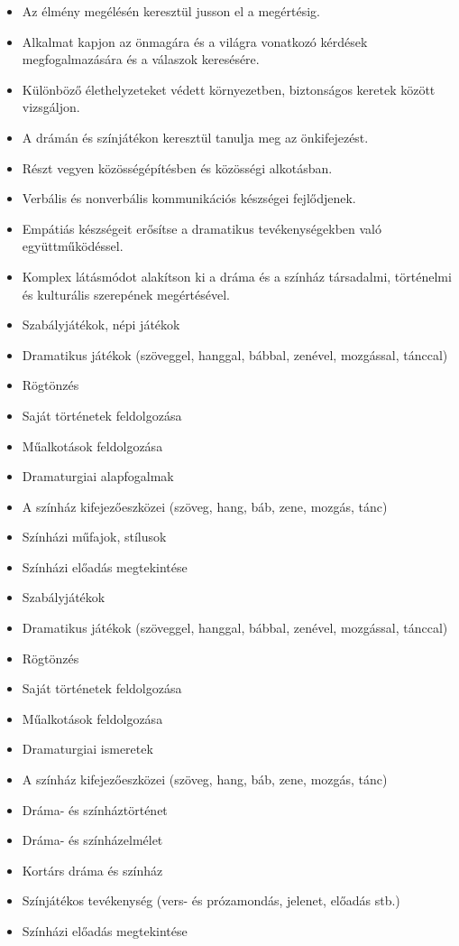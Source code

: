 \begin{itemize}
\item
  Az élmény megélésén keresztül jusson el a megértésig.
\item
  Alkalmat kapjon az önmagára és a világra vonatkozó kérdések
  megfogalmazására és a válaszok keresésére.
\item
  Különböző élethelyzeteket védett környezetben, biztonságos keretek
  között vizsgáljon.
\item
  A drámán és színjátékon keresztül tanulja meg az önkifejezést.
\item
  Részt vegyen közösségépítésben és közösségi alkotásban.
\item
  Verbális és nonverbális kommunikációs készségei fejlődjenek.
\item
  Empátiás készségeit erősítse a dramatikus tevékenységekben való
  együttműködéssel.
\item
  Komplex látásmódot alakítson ki a dráma és a színház társadalmi,
  történelmi és kulturális szerepének megértésével.
\item
  Szabályjátékok, népi játékok
\item
  Dramatikus játékok (szöveggel, hanggal, bábbal, zenével, mozgással,
  tánccal)
\item
  Rögtönzés
\item
  Saját történetek feldolgozása
\item
  Műalkotások feldolgozása
\item
  Dramaturgiai alapfogalmak
\item
  A színház kifejezőeszközei (szöveg, hang, báb, zene, mozgás, tánc)
\item
  Színházi műfajok, stílusok
\item
  Színházi előadás megtekintése
\item
  Szabályjátékok
\item
  Dramatikus játékok (szöveggel, hanggal, bábbal, zenével, mozgással,
  tánccal)
\item
  Rögtönzés
\item
  Saját történetek feldolgozása
\item
  Műalkotások feldolgozása
\item
  Dramaturgiai ismeretek
\item
  A színház kifejezőeszközei (szöveg, hang, báb, zene, mozgás, tánc)
\item
  Dráma- és színháztörténet
\item
  Dráma- és színházelmélet
\item
  Kortárs dráma és színház
\item
  Színjátékos tevékenység (vers- és prózamondás, jelenet, előadás stb.)
\item
  Színházi előadás megtekintése
\end{itemize}

